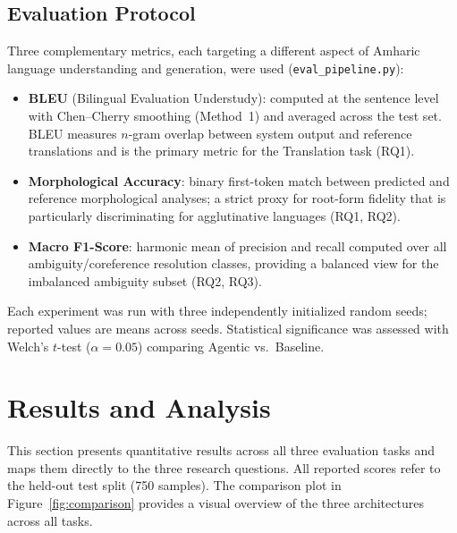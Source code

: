 \subsection{Evaluation Protocol}
\label{sec:eval}

Three complementary metrics, each targeting a different aspect of Amharic language
understanding and generation, were used (\texttt{eval\_pipeline.py}):

\begin{itemize}
  \item \textbf{BLEU} (Bilingual Evaluation Understudy): computed at the sentence level with
        Chen--Cherry smoothing (Method~1) and averaged across the test set.  BLEU measures
        $n$-gram overlap between system output and reference translations and is the primary
        metric for the Translation task (RQ1).
  \item \textbf{Morphological Accuracy}: binary first-token match between predicted and
        reference morphological analyses; a strict proxy for root-form fidelity that is
        particularly discriminating for agglutinative languages (RQ1, RQ2).
  \item \textbf{Macro F1-Score}: harmonic mean of precision and recall computed over all
        ambiguity/coreference resolution classes, providing a balanced view for the
        imbalanced ambiguity subset (RQ2, RQ3).
\end{itemize}

Each experiment was run with three independently initialized random seeds; reported values are
means across seeds.  Statistical significance was assessed with Welch's $t$-test
($\alpha = 0.05$) comparing Agentic vs.\ Baseline.


\section{Results and Analysis}
\label{sec:results}

This section presents quantitative results across all three evaluation tasks and maps them
directly to the three research questions.  All reported scores refer to the held-out test split
(750 samples).  The comparison plot in Figure~\ref{fig:comparison} provides a visual overview of
the three architectures across all tasks.

